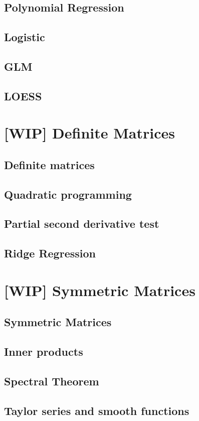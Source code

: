 \documentclass{amsbook}
\begin{document}
\section{Polynomial Regression}
\section{Logistic}
\section{GLM}
\section{LOESS}

\chapter{[WIP] Definite Matrices}
\section{Definite matrices}
\section{Quadratic programming}
\section{Partial second derivative test}
\section{Ridge Regression}

\chapter{[WIP] Symmetric Matrices}
\section{Symmetric Matrices}\label{SymmetricMatrices}
\section{Inner products}
\section{Spectral Theorem}
\section{Taylor series and smooth functions}\label{section_taylor_series}
\end{document}

